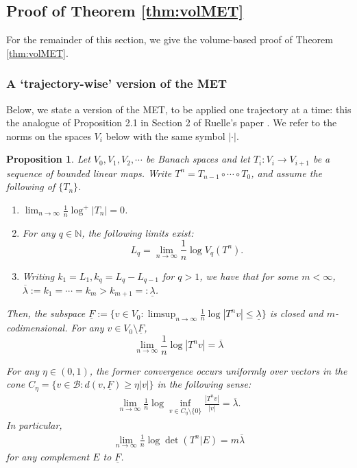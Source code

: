 \documentclass[11pt]{amsart}
\theoremstyle{theorem}
\newtheorem{prop}[thm]{Proposition}
\theoremstyle{definition}
\numberwithin{equation}{section}
\newcommand{\N}{\mathbb{N}}
\newcommand{\Bc}{\mathcal{B}}
\newcommand{\ol}{\overline{\lambda}}
\newcommand{\ul}{\underline{\lambda}}
\begin{document}
\subsection{Proof of Theorem \ref{thm:volMET}}

For the remainder of this section, we give the volume-based proof of Theorem \ref{thm:volMET}. 

\subsubsection{A `trajectory-wise' version of the MET}

Below, we state a version of the MET, to be applied one trajectory at a time: this the analogue of Proposition 2.1 in Section 2 of Ruelle's paper \cite{R2}. We refer to the norms on the spaces $V_i$ below with the same symbol $|\cdot|$.

\begin{prop} \label{prop:staticMET}
Let $V_0, V_1, V_2, \cdots$ be Banach spaces and let $T_i : V_i \to V_{i + 1}$ be a sequence of bounded linear maps. Write $T^n = T_{n-1} \circ \cdots \circ T_0$, and assume the following of $\{T_n\}$.

\begin{enumerate}
\item $\lim_{n \to \infty} \frac{1}{n} \log^+ |T_n| = 0$.

\item For any $q \in \N$, the following limits exist:
\[
L_q = \lim_{n \to \infty} \frac{1}{n} \log V_q(T^n).
\]
\item 
Writing $k_1 = L_1, k_q = L_q - L_{q-1}$ for $q > 1$, we have that for some $m < \infty$, $\ol := k_1 = \cdots = k_m > k_{m + 1} =: \ul$. 
\end{enumerate}
Then, the subspace $\underline{F} := \{v \in V_0 : \limsup_{n \to \infty} \frac{1}{n} \log |T^n v| \leq \ul \}$ is closed and $m$-codimensional. For any $v \in V_0 \setminus \underline{F}$, 
\[
\lim_{n \to \infty} \frac{1}{n} \log |T^n v| = \ol
\]

For any $\eta \in (0,1)$, the former convergence occurs uniformly over vectors in the cone $C_{\eta}= \{v \in \Bc : d(v, \underline{F}) \geq \eta  |v| \}$ in the following sense:
\begin{align}\label{eq:uniformGrowth}
\lim_{n \to \infty} \frac{1}{n} \log \inf_{v \in C_{\eta} \setminus \{0\}}\frac{ |T^n v|}{|v|} = \ol.
\end{align}
In particular,
\begin{align}\label{eq:staticVolumeGrowth}
\lim_{n \to \infty} \frac{1}{n} \log \det(T^n | E) = m \ol
\end{align}
for any complement $E$ to $\underline{F}$.
\end{prop}
\end{document}
